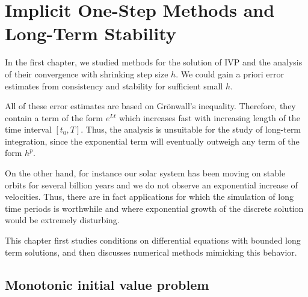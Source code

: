 \chapter{Implicit One-Step Methods and Long-Term Stability}

\begin{intro}
  In the first chapter, we studied methods for the solution of IVP and
  the analysis of their convergence with shrinking step size $h$.  We
  could gain a priori error estimates from consistency and stability
  for sufficient small $h$.

  All of these error estimates are based on Grönwall's
  inequality. Therefore, they contain a term of the form $e^{Lt}$
  which increases fast with increasing length of the time interval
  $[t_0,T]$. Thus, the analysis is unsuitable for the study of
  long-term integration, since the exponential term will eventually
  outweigh any term of the form $h^p$.
  
  On the other hand, for instance our solar system has been moving on
  stable orbits for several billion years and we do not observe an
  exponential increase of velocities. Thus, there are in fact
  applications for which the simulation of long time periods is
  worthwhile and where exponential growth of the discrete solution
  would be extremely disturbing.
	
  This chapter first studies conditions on differential equations with
  bounded long term solutions, and then discusses numerical methods
  mimicking this behavior.
\end{intro}

\section{Monotonic initial value problem}

